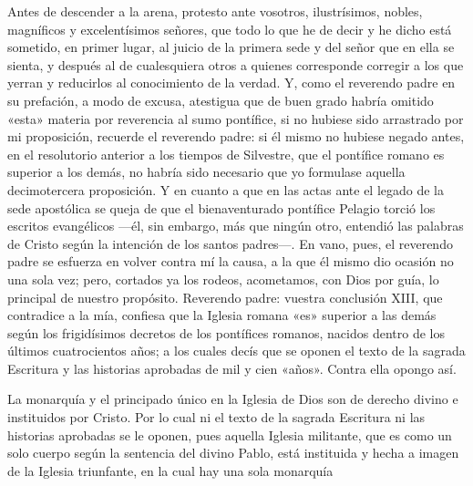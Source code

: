 Antes de descender a la arena, protesto ante vosotros, ilustrísimos, nobles, magníficos y excelentísimos señores, que todo lo que he de decir y he dicho está sometido, en primer lugar, al juicio de la primera sede y del señor que en ella se sienta, y después al de cualesquiera otros a quienes corresponde corregir a los que yerran y reducirlos al conocimiento de la verdad. Y, como el reverendo padre en su prefación, a modo de excusa, atestigua que de buen grado habría omitido «esta» materia por reverencia al sumo pontífice, si no hubiese sido arrastrado por mi proposición, recuerde el reverendo padre: si él mismo no hubiese negado antes, en el resolutorio anterior a los tiempos de Silvestre, que el pontífice romano es superior a los demás, no habría sido necesario que yo formulase aquella decimotercera proposición. Y en cuanto a que en las actas ante el legado de la sede apostólica se queja de que el bienaventurado pontífice Pelagio torció los escritos evangélicos —él, sin embargo, más que ningún otro, entendió las palabras de Cristo según la intención de los santos padres—. En vano, pues, el reverendo padre se esfuerza en volver contra mí la causa, a la que él mismo dio ocasión no una sola vez; pero, cortados ya los rodeos, acometamos, con Dios por guía, lo principal de nuestro propósito. Reverendo padre: vuestra conclusión XIII, que contradice a la mía, confiesa que la Iglesia romana «es» superior a las demás según los frigidísimos decretos de los pontífices romanos, nacidos dentro de los últimos cuatrocientos años; a los cuales decís que se oponen el texto de la sagrada Escritura y las historias aprobadas de mil y cien «años». Contra ella opongo así.

La monarquía y el principado único en la Iglesia de Dios son de derecho divino e instituidos por Cristo. Por lo cual ni el texto de la sagrada Escritura ni las historias aprobadas se le oponen, pues aquella Iglesia militante, que es como un solo cuerpo según la sentencia del divino Pablo, está instituida y hecha a imagen de la Iglesia triunfante, en la cual hay una sola monarquía

